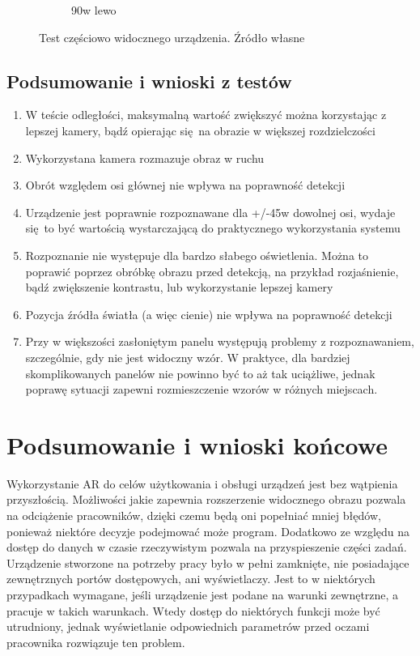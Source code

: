 \documentclass[12pt,twoside,polish]{article}
\begin{document}
\begin{figure}[htb!]
\begin{subfigure}[b]{0.5\textwidth}
		\caption{90\degree w lewo}
		\label{test_cover5}
	\end{subfigure}
	\caption{Test częściowo widocznego urządzenia. Źródło własne}
\end{figure}
\FloatBarrier

\subsection{Podsumowanie i wnioski z testów}
\begin{enumerate}[label=\alph*), leftmargin=1.25cm]
\item W teście odległości, maksymalną wartość zwiększyć można korzystając z lepszej kamery, bądź opierając się na obrazie w większej rozdzielczości
\item Wykorzystana kamera rozmazuje obraz w ruchu
\item Obrót względem osi głównej nie wpływa na poprawność detekcji
\item Urządzenie jest poprawnie rozpoznawane dla +/-45\degree w dowolnej osi, wydaje się to być wartością wystarczającą do praktycznego wykorzystania systemu
\item Rozpoznanie nie występuje dla bardzo słabego oświetlenia. Można to poprawić poprzez obróbkę obrazu przed detekcją, na przykład rozjaśnienie, bądź zwiększenie kontrastu, lub wykorzystanie lepszej kamery
\item Pozycja źródła światła (a więc cienie) nie wpływa na poprawność detekcji
\item Przy w większości zasłoniętym panelu występują problemy z rozpoznawaniem, szczególnie, gdy nie jest widoczny wzór. W praktyce, dla bardziej skomplikowanych panelów nie powinno być to aż tak uciążliwe, jednak poprawę sytuacji zapewni rozmieszczenie wzorów w różnych miejscach.
\end{enumerate}
\clearpage


\section{Podsumowanie i wnioski końcowe}
Wykorzystanie AR do celów użytkowania i obsługi urządzeń jest bez wątpienia przyszłością. Możliwości jakie zapewnia rozszerzenie widocznego obrazu pozwala na odciążenie pracowników, dzięki czemu będą oni popełniać mniej błędów, ponieważ niektóre decyzje podejmować może program. Dodatkowo ze względu na dostęp do danych w czasie rzeczywistym pozwala na przyspieszenie części zadań. Urządzenie stworzone na potrzeby pracy było w pełni zamknięte, nie posiadające zewnętrznych portów dostępowych, ani wyświetlaczy. Jest to w niektórych przypadkach wymagane, jeśli urządzenie jest podane na warunki zewnętrzne, a pracuje w takich warunkach. Wtedy dostęp do niektórych funkcji może być utrudniony, jednak wyświetlanie odpowiednich parametrów przed oczami pracownika rozwiązuje ten problem.
\end{document}
